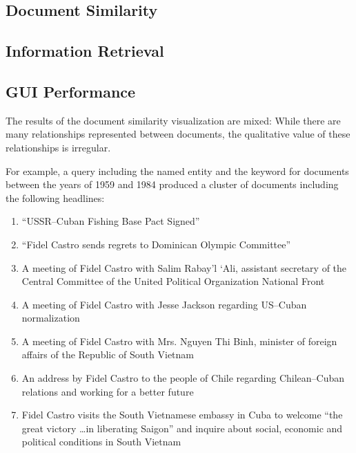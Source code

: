 \subsection {Document Similarity}
\label{sec:document_similarity}

\subsection {Information Retrieval}
\label{sec:information_retrieval}

\subsection {GUI Performance}
\label{sec:gui_performance}
The results of the document similarity visualization are mixed: While there are many relationships represented between documents, the qualitative value of these relationships is irregular.

For example, a query including the named entity  and the keyword  for documents between the years of 1959 and 1984 produced a cluster of documents including the following headlines:

\begin{enumerate}
\item ``USSR--Cuban Fishing Base Pact Signed''\label{eval:doc179}
\item ``Fidel Castro sends regrets to Dominican Olympic Committee''\label{eval:doc553}
\item A meeting of Fidel Castro with Salim Rabay'l `Ali, assistant secretary of the Central Committee of the United Political Organization National Front\label{eval:doc682}
\item A meeting of Fidel Castro with Jesse Jackson regarding US--Cuban normalization\label{eval:doc879}
\item A meeting of Fidel Castro with Mrs. Nguyen Thi Binh, minister of foreign affairs of the Republic of South Vietnam\label{eval:doc643}
\item An address by Fidel Castro to the people of Chile regarding Chilean--Cuban relations and working for a better future\label{eval:doc391}
\item Fidel Castro visits the South Vietnamese embassy in Cuba to welcome ``the great victory \ldots in liberating Saigon'' and inquire about social, economic and political conditions in South Vietnam\label{eval:doc626}
\end{enumerate} 


